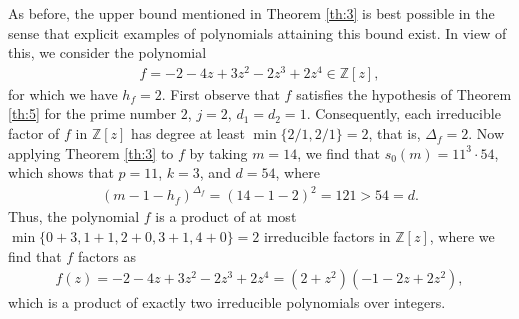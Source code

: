 \documentclass[12pt]{amsart}%
\begin{document}
As before, the upper bound mentioned in Theorem \ref{th:3} is best possible in the sense that explicit examples of polynomials attaining this bound exist. In view of this, we consider the polynomial
 \begin{eqnarray*}
 f=-2-4z+3z^2-2z^3+2z^4 \in \mathbb{Z}[z],
 \end{eqnarray*}
for which we have $h_{f}=2$. First observe that $f$ satisfies the hypothesis of Theorem \ref{th:5} for the prime number $2$, $j=2$, $d_1=d_2=1$.  Consequently, each irreducible factor of $f$ in $\mathbb{Z}[z]$ has degree at least $\min\{2/1,2/1\}=2$, that is, $\Delta_{f}=2$. Now applying Theorem \ref{th:3} to $f$ by taking $m=14$, we find that
 $s_0(m)=11^3\cdot 54$, which shows that $p=11$, $k=3$, and $d=54$, where
\begin{eqnarray*}
(m-1-h_{f})^{\Delta_{f}}=(14-1-2)^2=121>54=d.
\end{eqnarray*}
Thus, the polynomial $f$ is a product of at most $\min\{0+3,1+1,2+0,3+1,4+0\}=2$ irreducible factors in $\mathbb{Z}[z]$, where we find that $f$ factors as
		\begin{eqnarray*}
			f(z)=-2-4z+3z^2-2z^3+2z^4 =(2+z^2)(-1-2z+2z^2),
		\end{eqnarray*}
which is a product of exactly two irreducible polynomials over integers.
\end{document}
